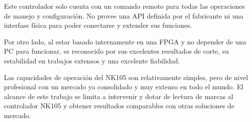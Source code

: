    Este controlador solo cuenta con un comando remoto para todas las operaciones de manejo y configuración.
   No provee una API definida por el fabricante ni una interfase física para poder conectarse y extender sus funciones. \par
   Por otro lado, al estar basado internamente en una FPGA y no depender de una PC para funcionar, es reconocido por sus excelentes resultados de corte, su estabilidad en trabajos extensos y una excelente fiabilidad. \par
   Las capacidades de operación del NK105 son relativamente simples, pero de nivel profesional con un mercado ya consolidado y muy extenso en todo el mundo.
   El alcance de este trabajo se limita a intervenir y dotar de lectura de marcas al controlador NK105 y obtener resultados comparables con otras soluciones de mercado.

